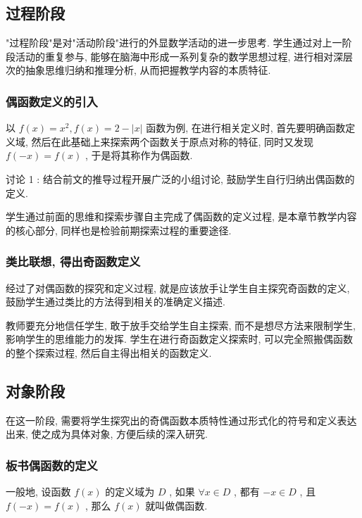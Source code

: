 \subsection{过程阶段}
"过程阶段"是对"活动阶段"进行的外显数学活动的进一步思考. 学生通过对上一阶段活动的重复参与, 能够在脑海中形成一系列复杂的数学思想过程, 进行相对深层次的抽象思维归纳和推理分析, 从而把握教学内容的本质特征.

\subsubsection{偶函数定义的引入}
以 $f(x)=x^{2}, f(x)=2-|x|$ 函数为例, 在进行相关定义时, 首先要明确函数定义域, 然后在此基础上来探索两个函数关于原点对称的特征, 同时又发现 $f(-x)=f(x)$ , 于是将其称作为偶函数.

讨论 1 : 结合前文的推导过程开展广泛的小组讨论, 鼓励学生自行归纳出偶函数的定义.
\begin{purpose}
	学生通过前面的思维和探索步骤自主完成了偶函数的定义过程, 是本章节教学内容的核心部分, 同样也是检验前期探索过程的重要途径.
\end{purpose}

\subsubsection{类比联想, 得出奇函数定义}
经过了对偶函数的探究和定义过程, 就是应该放手让学生自主探究奇函数的定义, 鼓励学生通过类比的方法得到相关的准确定义描述.
\begin{purpose}
	教师要充分地信任学生, 敢于放手交给学生自主探索, 而不是想尽方法来限制学生, 影响学生的思维能力的发挥. 学生在进行奇函数定义探索时, 可以完全照搬偶函数的整个探索过程, 然后自主得出相关的函数定义.
\end{purpose}

\subsection{对象阶段}
在这一阶段, 需要将学生探究出的奇偶函数本质特性通过形式化的符号和定义表达出来, 使之成为具体对象, 方便后续的深入研究.
\subsubsection{板书偶函数的定义}
\begin{tcolorbox}[colback=white, colframe=black, rounded corners, boxrule=0.1mm]
	一般地, 设函数 $f(x)$ 的定义域为 $D$ , 如果 $\forall x \in D$ , 都有 $-x \in D$ , 且 $f(-x)=f(x)$ , 那么 $f(x)$ 就叫做偶函数.
\end{tcolorbox}

